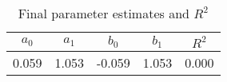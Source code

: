 
    \begin{table}\caption{Final parameter estimates and $R^2$}
\centering
    \begin{tabular}{ccccc}
    \toprule
    	 $a_0$ & $a_1$ & $b_0$ & $b_1$ & $R^2$ \\
    \hline0.059 & 1.053 & -0.059 & 1.053 & 0.000\\

    \bottomrule
    \end{tabular}
    \end{table}